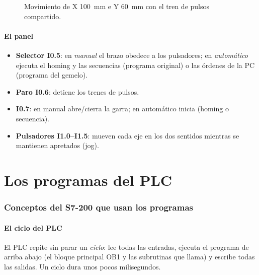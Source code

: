 \documentclass[a4paper,11pt]{article}
\begin{document}
\begin{figure}[H]
\centering
{}
\caption{Movimiento de X 100~mm e Y 60~mm con el tren de pulsos compartido.}
\end{figure}

\subsection{El panel}
\begin{itemize}
\item \textbf{Selector I0.5}: en \emph{manual} el brazo obedece a los pulsadores; en \emph{automático} ejecuta el homing y las secuencias (programa original) o las órdenes de la PC (programa del gemelo).
\item \textbf{Paro I0.6}: detiene los trenes de pulsos.
\item \textbf{I0.7}: en manual abre/cierra la garra; en automático inicia (homing o secuencia).
\item \textbf{Pulsadores I1.0--I1.5}: mueven cada eje en los dos sentidos mientras se mantienen apretados (jog).
\end{itemize}

\part{Los programas del PLC}

\section{Conceptos del S7-200 que usan los programas}

\subsection{El ciclo del PLC}
El PLC repite sin parar un \emph{ciclo}: lee todas las entradas, ejecuta el programa de arriba abajo (el bloque principal OB1 y las subrutinas que llama) y escribe todas las salidas. Un ciclo dura unos pocos milisegundos.
\end{document}
